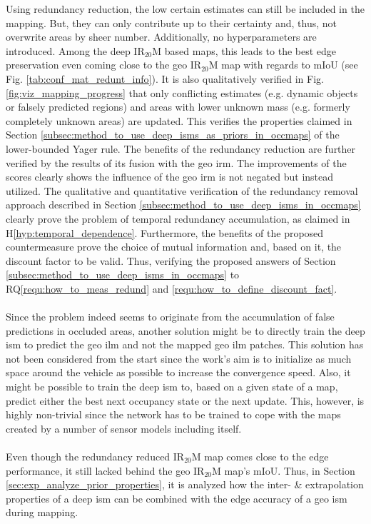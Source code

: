 Using redundancy reduction, the low certain estimates can still be included in the mapping. But, they can only contribute up to their certainty and, thus, not overwrite areas by sheer number. Additionally, no hyperparameters are introduced. Among the deep IR$_{20}$M based maps, this leads to the best edge preservation even coming close to the geo IR$_{20}$M map with regards to mIoU (see Fig. \ref{tab:conf_mat_redunt_info}). It is also qualitatively verified in Fig. \ref{fig:viz_mapping_progress} that only conflicting estimates (e.g. dynamic objects or falsely predicted regions) and areas with lower unknown mass (e.g. formerly completely unknown areas) are updated. This verifies the properties claimed in Section \ref{subsec:method_to_use_deep_isms_as_priors_in_occmaps} of the lower-bounded Yager rule. The benefits of the redundancy reduction are further verified by the results of its fusion with the geo \gls{irm}. The improvements of the scores clearly shows the influence of the geo \gls{irm} is not negated but instead utilized. The qualitative and quantitative verification of the redundancy removal approach described in Section \ref{subsec:method_to_use_deep_isms_in_occmaps} clearly prove the problem of temporal redundancy accumulation, as claimed in H\ref{hyp:temporal_dependence}. Furthermore, the benefits of the proposed countermeasure prove the choice of mutual information and, based on it, the discount factor to be valid. Thus, verifying the proposed answers of Section \ref{subsec:method_to_use_deep_isms_in_occmaps} to RQ\ref{requ:how_to_meas_redund} and \ref{requ:how_to_define_discount_fact}.
\\\\
Since the problem indeed seems to originate from the accumulation of false predictions in occluded areas, another solution might be to directly train the deep \gls{ism} to predict the geo \gls{ilm} and not the mapped geo \gls{ilm} patches. This solution has not been considered from the start since the work's aim is to initialize as much space around the vehicle as possible to increase the convergence speed. Also, it might be possible to train the deep \gls{ism} to, based on a given state of a map, predict either the best next occupancy state or the next update. This, however, is highly non-trivial since the network has to be trained to cope with the maps created by a number of sensor models including itself. 
\\\\
Even though the redundancy reduced IR$_{20}$M map comes close to the edge performance, it still lacked behind the geo IR$_{20}$M map's mIoU. Thus, in Section \ref{sec:exp_analyze_prior_properties}, it is analyzed how the inter- \& extrapolation properties of a deep \gls{ism} can be combined with the edge accuracy of a geo \gls{ism} during mapping.
%
